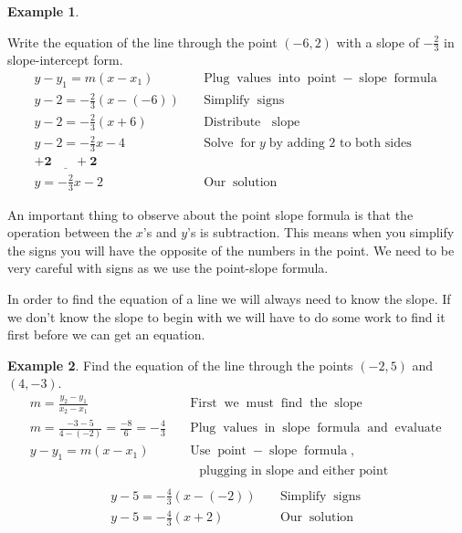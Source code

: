 \documentclass[12pt]{book}
\theoremstyle{definition}
\newtheorem{example}{Example}
\newcommand{\tmmathbf}[1]{\ensuremath{\boldsymbol{#1}}}
\newcommand{\tmop}[1]{\ensuremath{\operatorname{#1}}}
\begin{document}
\begin{example}\label{Lin64}\ \par
Write the equation of the line through the point $(- 6, 2)$ with a slope of $- \displaystyle\frac{2}{3}$ in slope-intercept form.
  \begin{eqnarray*}
    y - y_1 = m (x - x_1) &  & \tmop{Plug} \tmop{values} \tmop{into}
    \tmop{point} - \tmop{slope} \tmop{formula}\\
    y - 2 = - \frac{2}{3} \left(x - (- 6)\right) &  & \tmop{Simplify} \tmop{signs}\\
    y - 2 = - \frac{2}{3} (x + 6) &  & \tmop{Distribute~} \tmop{slope}\\
    y - 2 = - \frac{2}{3} x - 4 &  & \tmop{Solve} \tmop{for} y \tmop{by~adding~2~to~both~sides}\\
    \tmmathbf{\underline{+ 2 ~~~~~~~~ + 2}} &  & \\
    y = - \frac{2}{3} x - 2 &  & \tmop{Our} \tmop{solution}
  \end{eqnarray*}
\end{example}
An important thing to observe about the point slope formula is that the operation between the $x$'s and $y$'s is subtraction. This means when you simplify the signs you will have the opposite of the numbers in the point. We need to be very careful with signs as we use the point-slope formula.\par
In order to find the equation of a line we will always need to know the slope. If we don't know the slope to begin with we will have to do some work to find it first before we can get an equation.
\begin{example}\label{Lin65} Find the equation of the line through the points $(- 2, 5)$ and $(4, -3)$.
  \begin{eqnarray*}
    m = \frac{y_2 - y_1}{x_2 - x_1} &  & \tmop{First} \tmop{we} \tmop{must}
    \tmop{find} \tmop{the} \tmop{slope}\\
    m = \frac{- 3 - 5}{4 - (- 2)} = \frac{- 8}{6} = - \frac{4}{3} &  &
    \tmop{Plug} \tmop{values} \tmop{in} \tmop{slope} \tmop{formula} \tmop{and}
    \tmop{evaluate}\\
    y - y_1 = m (x - x_1) &  & \tmop{Use} \tmop{point} - \tmop{slope}
    \tmop{formula},\\
		& & \tmop{~~~plugging~in~slope~and~either~point}\\
  \end{eqnarray*}
  \begin{eqnarray*}
    y - 5 = - \frac{4}{3} (x - (- 2)) &  & \tmop{Simplify} \tmop{signs}\\
    y - 5 = - \frac{4}{3} (x + 2) &  & \tmop{Our} \tmop{solution}
  \end{eqnarray*}
\end{example}
\end{document}
